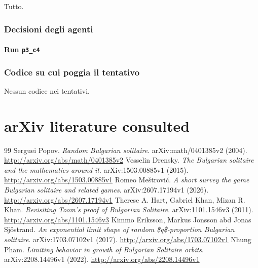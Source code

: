 \documentclass[11pt,a4paper]{article}
\begin{document}
Tutto.

\subsubsection{Decisioni degli agenti}
\paragraph{Run \texttt{p3\_c4}}

\subsubsection{Codice su cui poggia il tentativo}
Nessun codice nei tentativi.

\section{arXiv literature consulted}
\begin{thebibliography}{99}
 Serguei Popov. \emph{Random Bulgarian solitaire}. arXiv:math/0401385v2 (2004). \url{http://arxiv.org/abs/math/0401385v2}
 Vesselin Drensky. \emph{The Bulgarian solitaire and the mathematics around it}. arXiv:1503.00885v1 (2015). \url{http://arxiv.org/abs/1503.00885v1}
 Romeo Meštrović. \emph{A short survey the game Bulgarian solitaire and related games}. arXiv:2607.17194v1 (2026). \url{http://arxiv.org/abs/2607.17194v1}
 Therese A. Hart, Gabriel Khan, Mizan R. Khan. \emph{Revisiting Toom's proof of Bulgarian Solitaire}. arXiv:1101.1546v3 (2011). \url{http://arxiv.org/abs/1101.1546v3}
 Kimmo Eriksson, Markus Jonsson abd Jonas Sjöstrand. \emph{An exponential limit shape of random \$q\$-proportion Bulgarian solitaire}. arXiv:1703.07102v1 (2017). \url{http://arxiv.org/abs/1703.07102v1}
 Nhung Pham. \emph{Limiting behavior in growth of Bulgarian Solitaire orbits}. arXiv:2208.14496v1 (2022). \url{http://arxiv.org/abs/2208.14496v1}
\end{thebibliography}
\end{document}
